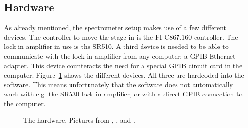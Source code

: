 \subsection{Hardware}

As already mentioned, the spectrometer setup makes use of a few different devices. The controller to move the stage in is the PI C867.160 controller. The lock in amplifier in use is the SR510. A third device is needed to be able to communicate with the lock in amplifier from any computer: a GPIB-Ethernet adapter. This device counteracts the need for a special GPIB circuit card in the computer. Figure~\ref{fig:hardware} shows the different devices. All three are hardcoded into the software. This means unfortunately that the software does not automatically work with e.g. the SR530 lock in amplifier, or with a direct GPIB connection to the computer.


\begin{figure}[h!tb]
	\begin{center}
		\qquad
		\qquad
		\caption{The hardware. Pictures from \cite{PI}, \cite{SR}, and \cite{prologix}.}
		\label{fig:hardware}
	\end{center}
\end{figure}

